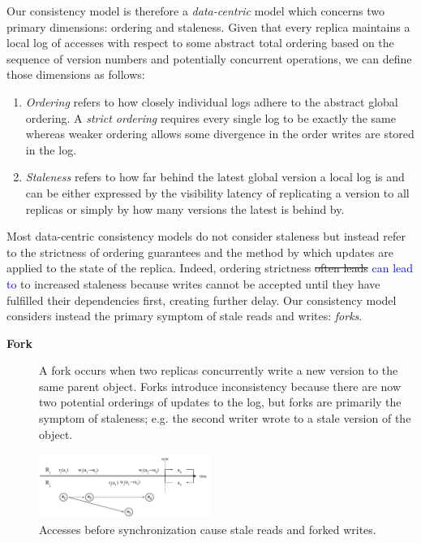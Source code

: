 \documentclass[10pt,conference,compsocconf,letterpaper]{IEEEtran}
\newcommand{\blue}[1]{{\textcolor{blue}{#1}}}
\begin{document}
Our consistency model is therefore a \textit{data-centric} model which concerns two primary dimensions: ordering and staleness. Given that every replica maintains a local log of accesses with respect to some abstract total ordering based on the sequence of version numbers and potentially concurrent operations, we can define those dimensions as follows:

\begin{enumerate}
    \item \textit{Ordering} refers to how closely individual logs adhere to the abstract global ordering. A \textit{strict ordering} requires every single log to be exactly the same whereas weaker ordering allows some divergence in the order writes are stored in the log.
    \item \textit{Staleness} refers to how far behind the latest global version a local log is and can be either expressed by the visibility latency of replicating a version to all replicas or simply by how many versions the latest is behind by.
\end{enumerate}

Most data-centric consistency models do not consider staleness but instead refer to the strictness of ordering guarantees and the method by which updates are applied to the state of the replica. Indeed, ordering strictness \st{often leads} \blue{can lead to} to increased staleness because writes cannot be accepted until they have fulfilled their dependencies first, creating further delay. Our consistency model considers instead the primary symptom of stale reads and writes: \textit{forks}.

\begin{description}
    \item[\textbf{Fork}] A fork occurs when two replicas concurrently write a new version to the same parent object. Forks introduce inconsistency because there are now two potential orderings of updates to the log, but forks are primarily the symptom of staleness; e.g. the second writer wrote to a stale version of the object.
\end{description}

\begin{figure}[t]
    \centering
    \includegraphics[width=0.5\textwidth]{figures/forks}
    \caption{Accesses before synchronization cause stale reads and forked writes.}
    \label{fig:forks}
\end{figure}
\end{document}
